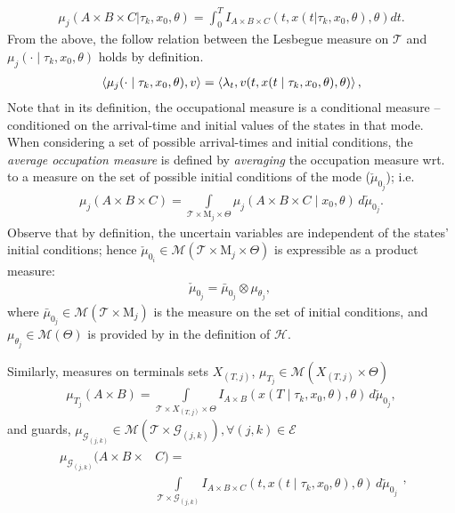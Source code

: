 \small
\begin{align}
\mu_j(A\times B\times C| \tau_k ,x_0,\theta)=\int_{0}^T I_{A\times B\times C}(t,x(t|\tau_k,x_0,\theta),\theta)dt.
\end{align}
\normalsize
From the above, the follow relation between the Lesbegue measure on $\mathcal T$ and $\mu_j(\cdot\mid \tau_k,x_0,\theta)$ holds by definition.
\begin{align}
\left\langle \mu_j(\cdot\mid \tau_k,x_0,\theta),v\right\rangle=\left\langle \lambda_t,v(t,x(t\mid \tau_k,x_0,\theta),\theta)\right\rangle,
\label{eq:mu_lambda}
\end{align}
Note that in its definition, the occupational measure is a conditional measure -- conditioned on the arrival-time and initial values of the states in that mode.
When considering a set of possible arrival-times and initial conditions, the {\em average occupation measure} is defined by {\em averaging} the occupation measure wrt. to a measure on the set of possible initial conditions of the mode ($\check\mu_{0_j}$); i.e.
\begin{align}
\mu_j(A\times B\times C)=\int\limits_{\mathcal T\times \mathrm M_j\times \Theta}\mu_j(A\times B\times C\mid x_0,\theta)\,d\check \mu_{0_j}.
\label{eq:mu_avg}
\end{align}
\normalsize
Observe that by definition, the uncertain variables are independent of the states' initial conditions; hence $\check\mu_{0_i}\in \mathcal M(\mathcal T\times\mathrm M_j\times \Theta)$ is expressible as a product measure:
\begin{align}
\check\mu_{0_j}=\bar\mu_{0_j}\otimes \mu_{\theta_j},\
\end{align}
where $\bar \mu_{0_j}\in \mathcal M(\mathcal T\times \mathrm M_j)$ is the measure on the set of initial conditions, and $\mu_{\theta_j}\in \mathcal M(\Theta)$ is provided by in the definition of $\mathcal H$.\par
Similarly, measures on terminals sets $X_{(T,j)}$, $\mu_{T_j}\in \mathcal M(X_{(T,j)}\times \Theta)$
\begin{align}
\mu_{T_j}(A\times B)=\int\limits_{\mathcal T\times X_{(T,j)}\times \Theta}I_{A\times B}(x(T\mid \tau_k,x_0,\theta),\theta)\,d\check\mu_{0_{j}},
\end{align}
and guards, $\mu_{\mathcal G_{(j,k)}}\in \mathcal M(\mathcal T\times \mathcal G_{(j,k)}),\forall(j,k)\in \mathcal E$
\begin{align}
\begin{split}
\mu_{\mathcal G_{(j,k)}}(A\times B\times& C)=\\&\int\limits_{\mathcal T\times \mathcal G_{(j,k)}}I_{A\times B\times C}(t,x(t\mid \tau_k,x_0,\theta),\theta)\,d\check\mu_{0_{j}}
\end{split},
\end{align}
